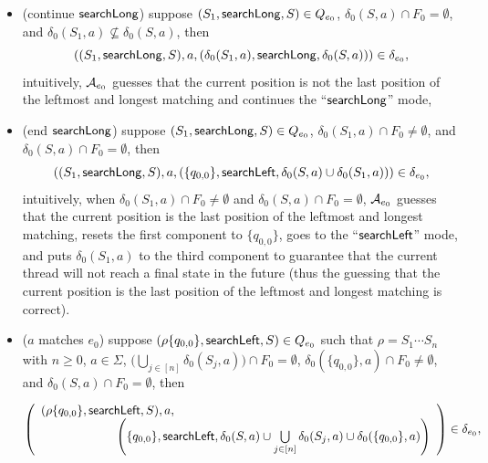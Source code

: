 \begin{itemize}
\begin{itemize}
		\item (continue $\mathsf{searchLong}$) suppose $(S_1, \mathsf{searchLong}, S) \in Q_{e_0}$, $\delta_0(S,a) \cap F_0 = \emptyset$, and $\delta_0(S_1,a) \not \subseteq \delta_0(S,a)$, then 
		$$((S_1, \mathsf{searchLong}, S), a, (\delta_0(S_1,a), \mathsf{searchLong}, \delta_0(S,a))) \in \delta_{e_0},$$
		intuitively, $\mathcal{A}_{e_0}$ guesses that the current position is not the last position of the leftmost and longest matching and continues the ``$\mathsf{searchLong}$'' mode,
		\item (end $\mathsf{searchLong}$) suppose $(S_1, \mathsf{searchLong}, S) \in Q_{e_0}$, $\delta_0(S_1,a) \cap F_0 \neq \emptyset$, and $\delta_0(S,a) \cap F_0 = \emptyset$, then 
		$$((S_1, \mathsf{searchLong}, S), a, (\{q_{0,0}\}, \mathsf{searchLeft}, \delta_0(S,a) \cup \delta_0(S_1,a))) \in \delta_{e_0},$$
		intuitively, when $\delta_0(S_1,a) \cap F_0 \neq \emptyset$ and $\delta_0(S,a) \cap F_0 = \emptyset$, $\mathcal{A}_{e_0}$ guesses that the current position is the last position of the leftmost and longest matching, resets the first component to $\{q_{0,0}\}$, goes to the ``$\mathsf{searchLeft}$'' mode, and puts $\delta_0(S_1, a)$ to the third component to guarantee that the current thread will not reach a final state in the future (thus the guessing that the current position is the last position of the leftmost and longest matching is correct).
		\item ($a$ matches $e_0$) suppose $(\rho \{q_{0,0}\}, \mathsf{searchLeft}, S) \in Q_{e_0}$ such that $\rho = S_1 \cdots S_n$ with $n \ge 0$,  $a \in \Sigma$, $\big(\bigcup \limits_{j \in [n]} \delta_0(S_j, a) \big) \cap F_0 = \emptyset$, $\delta_0(\{q_{0,0}\}, a) \cap F_0 \neq \emptyset$, and $\delta_0(S,a) \cap F_0 = \emptyset$, then
		
		\medskip
		$\left(
		\begin{array}{l l}
		(\rho \{q_{0,0}\}, \searchleft, S), a, &\\
		& \hspace{-2cm} \left(\{q_{0,0}\}, \searchleft, \delta_0(S,a) \cup \bigcup \limits_{j \in [n]} \delta_0(S_j, a) \cup \delta_0(\{q_{0,0}\}, a) \right)
		\end{array}
		\right) \in \delta_{e_0},$
		

\end{itemize}
\end{itemize}
